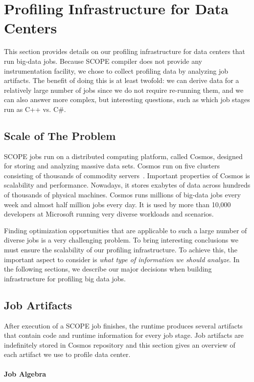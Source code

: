 \section{Profiling Infrastructure for Data Centers}
This section provides details on our profiling infrastructure for data centers that run big-data jobs. Because SCOPE compiler does not provide any instrumentation facility, we chose to collect profiling data by analyzing job artifacts. The benefit of doing this is at least twofold: we can derive data for a relatively large number of jobs since we do not require re-running them, and we can also answer more complex, but interesting questions, such as which job stages run as C++ vs. C\#.

\subsection{Scale of The Problem}
SCOPE jobs run on a distributed computing platform, called Cosmos, designed for storing and analyzing massive data sets. Cosmos run on five clusters consisting of thousands of commodity servers~\cite{SCOPE}. Important properties of Cosmos is scalability and performance. Nowadays, it stores exabytes of data across hundreds of thousands of physical machines. Cosmos runs millions of big-data jobs every week and almost half million jobs every day. It is used by more than 10,000 developers at Microsoft running very diverse workloads and scenarios.

Finding optimization opportunities that are applicable to such a large number of diverse jobs is a very challenging problem. To bring interesting conclusions we must ensure the scalability of our profiling infrastructure. To achieve this, the important aspect to consider is \emph{what type of information we should analyze}. In the following sections, we describe our major decisions when building infrastructure for profiling big data jobs.

\subsection{Job Artifacts}
\label{sec:artifacts}

After execution of a SCOPE job finishes, the runtime produces several artifacts that contain code and runtime information for every job stage. Job artifacts are indefinitely stored in Cosmos repository and this section gives an overview of each artifact we use to profile data center.
\paragraph{Job Algebra}


